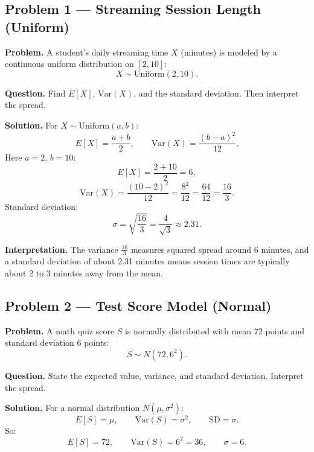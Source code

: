 



\begin{ExamProblems}

\item
\subsection*{Problem 1 — Streaming Session Length (Uniform)}

\textbf{Problem.}
A student's daily streaming time \(X\) (minutes) is modeled by a continuous uniform distribution on \([2,10]\):
\[
X\sim \text{Uniform}(2,10).
\]

\textbf{Question.} Find \(E[X]\), \(\mathrm{Var}(X)\), and the standard deviation. Then interpret the spread.

\textbf{Solution.}
For \(X\sim\text{Uniform}(a,b)\):
\[
E[X]=\frac{a+b}{2},\qquad \mathrm{Var}(X)=\frac{(b-a)^2}{12}.
\]
Here \(a=2\), \(b=10\):
\[
E[X]=\frac{2+10}{2}=6,
\]
\[
\mathrm{Var}(X)=\frac{(10-2)^2}{12}=\frac{8^2}{12}=\frac{64}{12}=\frac{16}{3}.
\]
Standard deviation:
\[
\sigma=\sqrt{\frac{16}{3}}=\frac{4}{\sqrt{3}}\approx 2.31.
\]

\textbf{Interpretation.}
The variance \(\frac{16}{3}\) measures squared spread around 6 minutes, and a standard deviation of about 2.31 minutes means session times are typically about 2 to 3 minutes away from the mean.


\item
\subsection*{Problem 2 — Test Score Model (Normal)}

\textbf{Problem.}
A math quiz score \(S\) is normally distributed with mean 72 points and standard deviation 6 points:
\[
S\sim N(72,6^2).
\]

\textbf{Question.} State the expected value, variance, and standard deviation. Interpret the spread.

\textbf{Solution.}
For a normal distribution \(N(\mu,\sigma^2)\):
\[
E[S]=\mu,\qquad \mathrm{Var}(S)=\sigma^2,\qquad \text{SD}=\sigma.
\]
So:
\[
E[S]=72,\qquad \mathrm{Var}(S)=6^2=36,\qquad \sigma=6.
\]


\end{ExamProblems}
